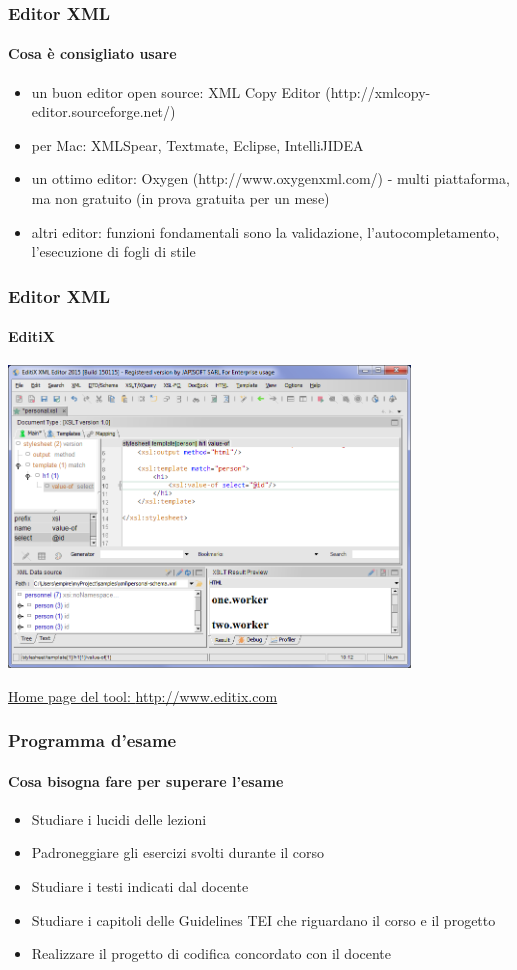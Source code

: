 \begin{frame}
	\frametitle{Editor XML}
	\framesubtitle{Cosa è consigliato usare}
	\addtocounter{nframe}{1}

	\begin{itemize}
		\item un buon editor open source: XML Copy Editor (http://xmlcopy-editor.sourceforge.net/)
		\item per Mac: XMLSpear, Textmate, Eclipse, IntelliJIDEA
		\item un ottimo editor: Oxygen (http://www.oxygenxml.com/) - multi piattaforma, ma non gratuito (in prova gratuita per un mese)
		\item altri editor: funzioni fondamentali sono la validazione, l’autocompletamento, l’esecuzione di fogli di stile
	\end{itemize}

\end{frame}

\begin{frame}
	\frametitle{Editor XML}
	\framesubtitle{EditiX}
	\addtocounter{nframe}{1}

	\begin{center}
		\includegraphics[width=0.8\textwidth]{imgs/maxi2.png}
	\end{center}

	\href{http://www.editix.com}{Home page del tool: \url{http://www.editix.com}}


\end{frame}

\begin{frame}
	\frametitle{Programma d’esame}
	\framesubtitle{Cosa bisogna fare per superare l'esame}
	\addtocounter{nframe}{1}

	\begin{itemize}
		\item Studiare i lucidi delle lezioni
		\item Padroneggiare gli esercizi svolti durante il corso
		\item Studiare i testi indicati dal docente
		\item Studiare i capitoli delle Guidelines TEI che riguardano il corso e il progetto
		\item Realizzare il progetto di codifica concordato con il docente
	\end{itemize}

\end{frame}

